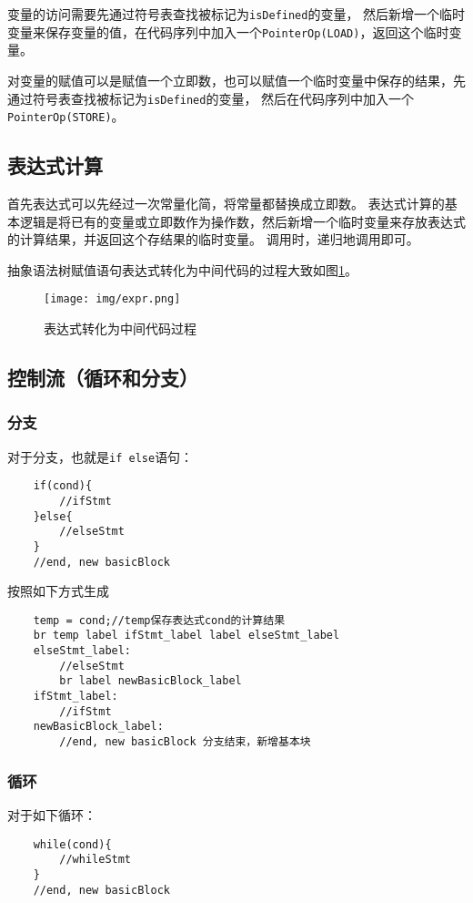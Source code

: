 变量的访问需要先通过符号表查找被标记为\texttt{isDefined}的变量，
然后新增一个临时变量来保存变量的值，在代码序列中加入一个\texttt{PointerOp(LOAD)}，返回这个临时变量。

对变量的赋值可以是赋值一个立即数，也可以赋值一个临时变量中保存的结果，先通过符号表查找被标记为\texttt{isDefined}的变量，
然后在代码序列中加入一个\texttt{PointerOp(STORE)}。

\subsection{表达式计算}

首先表达式可以先经过一次常量化简，将常量都替换成立即数。
表达式计算的基本逻辑是将已有的变量或立即数作为操作数，然后新增一个临时变量来存放表达式的计算结果，并返回这个存结果的临时变量。
调用时，递归地调用即可。

抽象语法树赋值语句表达式转化为中间代码的过程大致如图\ref{fig:expr}。

\begin{figure}[htbp]
	\centering
	\texttt{[image: img/expr.png]}
	\caption{表达式转化为中间代码过程}
	\label{fig:expr}
\end{figure}

\subsection{控制流（循环和分支）}
\subsubsection{分支}
对于分支，也就是\texttt{if else}语句：

\begin{verbatim}
    if(cond){
        //ifStmt
    }else{
        //elseStmt
    }
    //end, new basicBlock
\end{verbatim}
按照如下方式生成

\begin{verbatim}
    temp = cond;//temp保存表达式cond的计算结果
    br temp label ifStmt_label label elseStmt_label
    elseStmt_label:
        //elseStmt
        br label newBasicBlock_label
    ifStmt_label:
        //ifStmt
    newBasicBlock_label:
        //end, new basicBlock 分支结束，新增基本块
\end{verbatim}

\subsubsection{循环}
对于如下循环：
\begin{verbatim}
    while(cond){
        //whileStmt
    }
    //end, new basicBlock
\end{verbatim}

